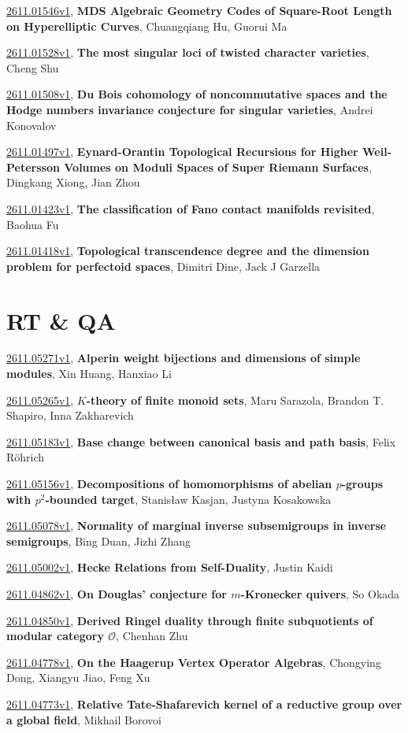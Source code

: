 \documentclass[9pt, a4paper]{article}
\theoremstyle{plain}
\theoremstyle{definition}
\theoremstyle{remark}
\newcommand{\arxiv}[3]{\href{https://arxiv.org/abs/#1}{#1}, \textbf{\textcolor{arxivblue}{#2}}, #3}
\begin{document}
\arxiv{2611.01546v1}{MDS Algebraic Geometry Codes of Square-Root Length on Hyperelliptic Curves}{Chuangqiang Hu, Guorui Ma}

\arxiv{2611.01528v1}{The most singular loci of twisted character varieties}{Cheng Shu}

\arxiv{2611.01508v1}{Du Bois cohomology of noncommutative spaces and the Hodge numbers invariance conjecture for singular varieties}{Andrei Konovalov}

\arxiv{2611.01497v1}{Eynard-Orantin Topological Recursions for Higher Weil-Petersson Volumes on Moduli Spaces of Super Riemann Surfaces}{Dingkang Xiong, Jian Zhou}

\arxiv{2611.01423v1}{The classification of Fano contact manifolds revisited}{Baohua Fu}

\arxiv{2611.01418v1}{Topological transcendence degree and the dimension problem for perfectoid spaces}{Dimitri Dine, Jack J Garzella}


\section{RT \& QA}
\arxiv{2611.05271v1}{Alperin weight bijections and dimensions of simple modules}{Xin Huang, Hanxiao Li}

\arxiv{2611.05265v1}{$K$-theory of finite monoid sets}{Maru Sarazola, Brandon T. Shapiro, Inna Zakharevich}

\arxiv{2611.05183v1}{Base change between canonical basis and path basis}{Felix Röhrich}

\arxiv{2611.05156v1}{Decompositions of homomorphisms of abelian $p$-groups with $p^2$-bounded target}{Stanisław Kasjan, Justyna Kosakowska}

\arxiv{2611.05078v1}{Normality of marginal inverse subsemigroups in inverse semigroups}{Bing Duan, Jizhi Zhang}

\arxiv{2611.05002v1}{Hecke Relations from Self-Duality}{Justin Kaidi}

\arxiv{2611.04862v1}{On Douglas' conjecture for $m$-Kronecker quivers}{So Okada}

\arxiv{2611.04850v1}{Derived Ringel duality through finite subquotients of modular category $\mathcal O$}{Chenhan Zhu}

\arxiv{2611.04778v1}{On the Haagerup Vertex Operator Algebras}{Chongying Dong, Xiangyu Jiao, Feng Xu}

\arxiv{2611.04773v1}{Relative Tate-Shafarevich kernel of a reductive group over a global field}{Mikhail Borovoi}
\end{document}
